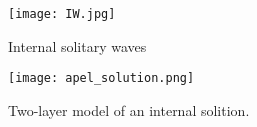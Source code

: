 
\begin{figure}[h]
\centering
  \texttt{[image: IW.jpg]}\\
  \caption{Internal solitary waves}
  \label{fig:IW_overview}
\end{figure}

\begin{figure}[h]
\centering
  \texttt{[image: apel\_solution.png]}\\
  \caption{Two-layer model of an internal solition.}
  \label{fig:two_layer_IW}
\end{figure}